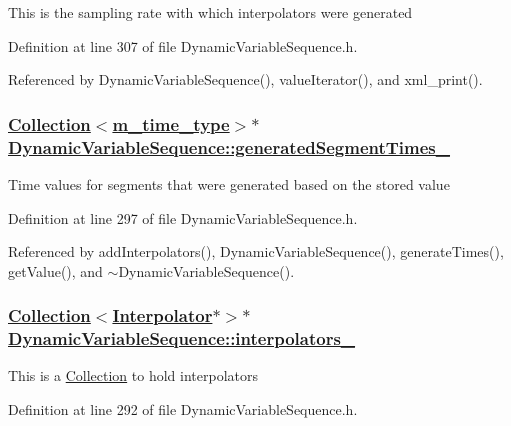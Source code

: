 This is the sampling rate with which interpolators were generated 

Definition at line 307 of file Dynamic\-Variable\-Sequence.h.

Referenced by Dynamic\-Variable\-Sequence(), value\-Iterator(), and xml\_\-print().\hypertarget{classDynamicVariableSequence_r3}{
\subsubsection[generatedSegmentTimes\_\-]{\setlength{\rightskip}{0pt plus 5cm}\hyperlink{classCollection}{Collection}$<$\hyperlink{Types_8h_a2}{m\_\-time\_\-type}$>$$\ast$ \hyperlink{classDynamicVariableSequence_r3}{Dynamic\-Variable\-Sequence::generated\-Segment\-Times\_\-}}}
\label{classDynamicVariableSequence_r3}


Time values for segments that were generated based on the stored value 

Definition at line 297 of file Dynamic\-Variable\-Sequence.h.

Referenced by add\-Interpolators(), Dynamic\-Variable\-Sequence(), generate\-Times(), get\-Value(), and $\sim$Dynamic\-Variable\-Sequence().\hypertarget{classDynamicVariableSequence_r2}{
\subsubsection[interpolators\_\-]{\setlength{\rightskip}{0pt plus 5cm}\hyperlink{classCollection}{Collection}$<$\hyperlink{classInterpolator}{Interpolator}$\ast$$>$$\ast$ \hyperlink{classDynamicVariableSequence_r2}{Dynamic\-Variable\-Sequence::interpolators\_\-}}}
\label{classDynamicVariableSequence_r2}


This is a \hyperlink{classCollection}{Collection} to hold interpolators 

Definition at line 292 of file Dynamic\-Variable\-Sequence.h.

